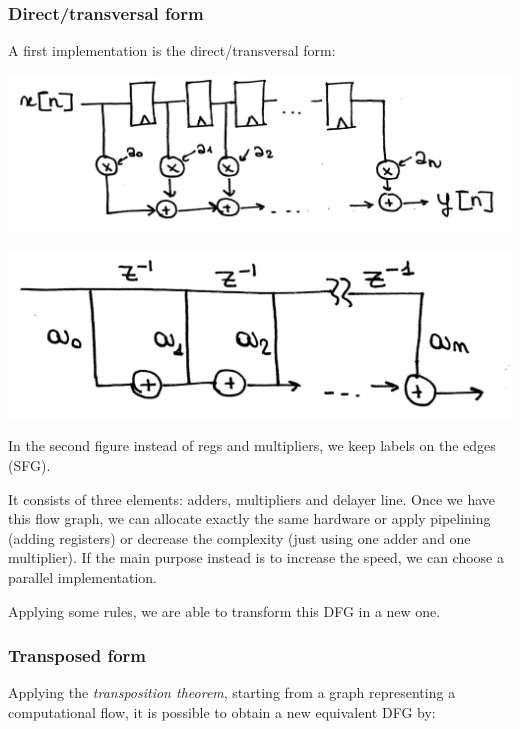 \subsubsection{Direct/transversal form}
A first implementation is the direct/transversal form:

\begin{center}
  \includegraphics[width=0.7\linewidth]{img/img1/01}
\end{center}

\begin{center}
  \includegraphics[width=0.7\linewidth]{img/img1/02}
\end{center}

In the second figure instead of regs and multipliers, we keep labels on the edges (SFG).

It consists of three elements: adders, multipliers and delayer line. Once we have this flow graph, we can allocate exactly the same hardware or apply pipelining (adding registers) or decrease the complexity (just using one adder and one multiplier). If the main purpose instead is to increase the speed, we can choose a parallel implementation.

Applying some rules, we are able to transform this DFG in a new one.

\subsubsection{Transposed form}

Applying the \textit{transposition theorem}, starting from a graph representing a computational flow, it is possible to obtain a new equivalent DFG by:

